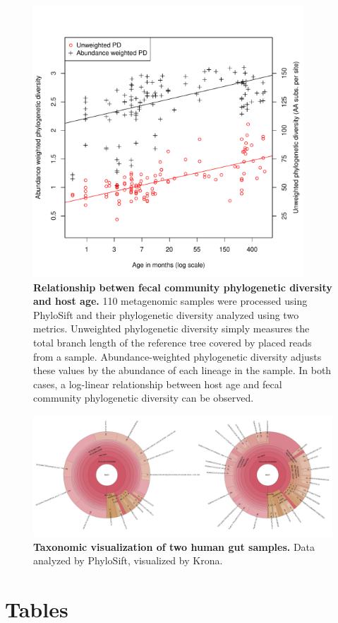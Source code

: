 \documentclass[10pt]{article}
\begin{document}
\begin{figure}[hp]
\begin{center}
\includegraphics[width=4in]{figures/phylo_diversity.pdf}
\end{center}
\caption{\textbf{Relationship betwen fecal community phylogenetic diversity and host age.} 110 metagenomic samples were processed using PhyloSift and their phylogenetic diversity analyzed using two metrics. Unweighted phylogenetic diversity simply measures the total branch length of the reference tree covered by placed reads from a sample. Abundance-weighted phylogenetic diversity adjusts these values by the abundance of each lineage in the sample. In both cases, a log-linear relationship between host age and fecal community phylogenetic diversity can be observed.}
\label{fig:agediversity}
\end{figure}

\begin{figure}[hp]
\begin{center}
\includegraphics[width=6.5in]{figures/krona_two.pdf}
\end{center}
\caption{\textbf{Taxonomic visualization of two human gut samples.} Data analyzed by PhyloSift, visualized by Krona.}
\label{fig:kronaplots}
\end{figure}

\clearpage

\section*{Tables}


\clearpage
\end{document}
